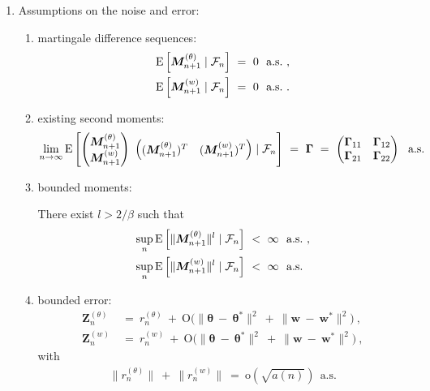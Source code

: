 \documentclass{article}
\newcommand\Bw{\bm{w}}
\newcommand\BM{\bm{M}}
\newcommand\BZ{\bm{Z}}
\newcommand\Bth{\bm{\theta}}
\newcommand\BGa{\bm{\Gamma}}
\newcommand{\rE}{\mathrm{E}} \newcommand{\rF}{\mathrm{F}}
\newcommand{\rO}{\mathrm{O}} \newcommand{\rP}{\mathrm{P}}
\newcommand{\Ro}{\mathrm{o}} \newcommand{\Rp}{\mathrm{p}}
\begin{document}
\begin{enumerate}[label=\textbf{(A\arabic*)}]
\item Assumptions on the noise and error:
\begin{enumerate}
\item martingale difference sequences:
\begin{align}
\rE \left[\BM^{(\theta)}_{n+1} \mid  \cF_n\right]
\ &= \ 0 \ \ \text{a.s.} \ , \\
\rE \left[\BM^{(w)}_{n+1} \mid  \cF_n\right]
\ &= \ 0 \ \ \text{a.s.} \ .
\end{align}
\item existing second moments:
\begin{align}
\lim_{n \to \infty} \rE \left[
\begin{pmatrix}
\BM^{(\theta)}_{n+1} \\
\BM^{(w)}_{n+1}
\end{pmatrix} \
\begin{pmatrix}
(\BM^{(\theta)}_{n+1})^T &
(\BM^{(w)}_{n+1})^T
\end{pmatrix}
 \mid  \cF_n\right] \ = \
\BGa \ = \
\begin{pmatrix}
\BGa_{11} & \BGa_{12} \\
\BGa_{21} & \BGa_{22}
\end{pmatrix} \ \
 \text{a.s.}
\end{align}

\item bounded moments:

There exist $l>2/\beta$ such that
\begin{align}
\sup_n \rE \left[ \| \BM^{(\theta)}_{n+1}\|^l \mid  \cF_n\right]
\ &< \ \infty \ \ \text{a.s.} \ , \\
\sup_n \rE \left[ \| \BM^{(w)}_{n+1}\|^l \mid  \cF_n\right]
\ &< \ \infty \ \ \text{a.s.}
\end{align}


\item bounded error:
\begin{align}
\BZ^{(\theta)}_{n} \ &= \ r^{(\theta)}_n \ + \
\rO\big( \| \Bth \ - \ \Bth^{*} \|^2 \ + \
\| \Bw \ - \  \Bw^{*}\|^2 \big) \ , \\
\BZ^{(w)}_{n} \ &= \ r^{(w)}_n \ + \
\rO\big( \| \Bth \ - \ \Bth^{*} \|^2 \ + \
\| \Bw \ - \  \Bw^{*}\|^2 \big) \ ,
\end{align}
with
\begin{align}
\| r^{(\theta)}_n\| \ +  \ \| r^{(w)}_n \| \ = \ \Ro(\sqrt{a(n)}) \ \ \text{a.s.}
\end{align}
\end{enumerate}

\end{enumerate}
\end{document}
